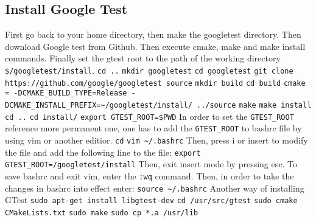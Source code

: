 \documentclass[10pt]{article}
\begin{document}
\subsection{Install Google Test}
First go back to your home directory, then make the googletest directory. Then download Google test from Github. Then execute  cmake, make and make install commands. Finally set the gtest root to the path of the working directory \texttt{\$/googletest/install}.
\newline
\texttt{cd ..}
\newline
\texttt{mkdir googletest}
\newline
\texttt{cd googletest}
\newline
\texttt{git clone https://github.com/google/googletest source}
\newline
\texttt{mkdir build}
\newline
\texttt{cd build}
\newline
\texttt{cmake = -DCMAKE\_BUILD\_TYPE=Release -DCMAKE\_INSTALL\_PREFIX=\textasciitilde/googletest/install/ ../source}
\newline
\texttt{make}
\newline
\texttt{make install}
\newline
\texttt{cd ..}
\newline
\texttt{cd install/}
\newline
\texttt{export GTEST\_ROOT=\$PWD}
\newline
In order to set the \texttt{GTEST\_ROOT} reference more permanent one, one has to add the \texttt{GTEST\_ROOT} to bashrc file by using vim or another editior.
\newline
\texttt{cd}
\newline
\texttt{vim \textasciitilde/.bashrc}
\newline
Then, press i or insert to modify the file and add the following line to the file: 
\newline
\texttt{export GTEST\_ROOT=/googletest/install}
\newline
Then, exit insert  mode by pressing esc. To save bashrc and exit vim, enter the \texttt{:wq} command. Then, in order to take the changes in bashrc into effect enter:
\newline
\texttt{source \textasciitilde/.bashrc}
\newline
\noindent Another way of installing GTest
\newline
\texttt{sudo apt-get install libgtest-dev}
\newline
\texttt{cd /usr/src/gtest}
\newline
\texttt{sudo cmake CMakeLists.txt}
\newline
\texttt{sudo make}
\newline
\texttt{sudo cp *.a /usr/lib}
\newline
\end{document}
